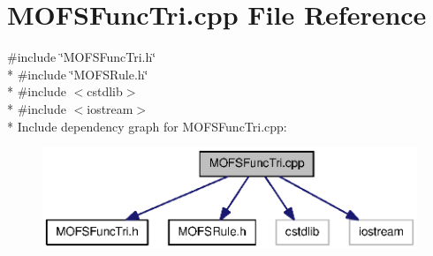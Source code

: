 \section{M\-O\-F\-S\-Func\-Tri.\-cpp File Reference}
\label{MOFSFuncTri_8cpp}
{\ttfamily \#include \char`\"{}M\-O\-F\-S\-Func\-Tri.\-h\char`\"{}}\\*
{\ttfamily \#include \char`\"{}M\-O\-F\-S\-Rule.\-h\char`\"{}}\\*
{\ttfamily \#include $<$cstdlib$>$}\\*
{\ttfamily \#include $<$iostream$>$}\\*
Include dependency graph for M\-O\-F\-S\-Func\-Tri.\-cpp\-:\nopagebreak
\begin{figure}[H]
\begin{center}
\leavevmode
\includegraphics[width=350pt]{MOFSFuncTri_8cpp__incl}
\end{center}
\end{figure}

